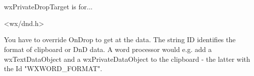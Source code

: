 \section{}\label{wxprivatedroptarget}

wxPrivateDropTarget is for...




<wx/dnd.h>




\label{wxprivatedroptargetwxprivatedroptarget}


\label{wxprivatedroptargetsetid}


You have to override OnDrop to get at the data.
The string ID identifies the format of clipboard or DnD data. A word
processor would e.g. add a wxTextDataObject and a wxPrivateDataObject
to the clipboard - the latter with the Id "WXWORD\_FORMAT".

\label{wxprivatedroptargetgetid}



